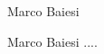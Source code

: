 \begin{participant}[type=PI,PM=12,gender=male,salary=2500]{Marco Baiesi}

  Marco Baiesi ....

\end{participant}


